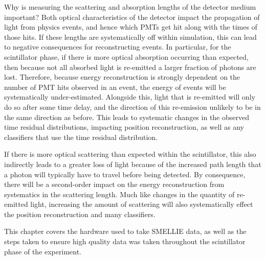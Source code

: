 Why is measuring the scattering and absorption lengths of the detector medium important? Both optical characteristics of the detector impact the propagation of light from physics events, and hence which PMTs get hit along with the times of those hits. If these lengths are systematically off within simulation, this can lead to negative consequences for reconstructing events. In particular, for the scintillator phase, if there is more optical absorption occurring than expected, then because not all absorbed light is re-emitted a larger fraction of photons are lost. Therefore, because energy reconstruction is strongly dependent on the number of PMT hits observed in an event, the energy of events will be systematically under-estimated. Alongside this, light that is re-emitted will only do so after some time delay, and the direction of this re-emission unlikely to be in the same direction as before. This leads to systematic changes in the observed time residual distributions, impacting position reconstruction, as well as any classifiers that use the time residual distribution.

If there is more optical scattering than expected within the scintillator, this also indirectly leads to a greater loss of light because of the increased path length that a photon will typically have to travel before being detected. By consequence, there will be a second-order impact on the energy reconstruction from systematics in the scattering length. Much like changes in the quantity of re-emitted light, increasing the amount of scattering will also systematically effect the position reconstruction and many classifiers.

This chapter covers the hardware used to take SMELLIE data, as well as the steps taken to ensure high quality data was taken throughout the scintillator phase of the experiment.


